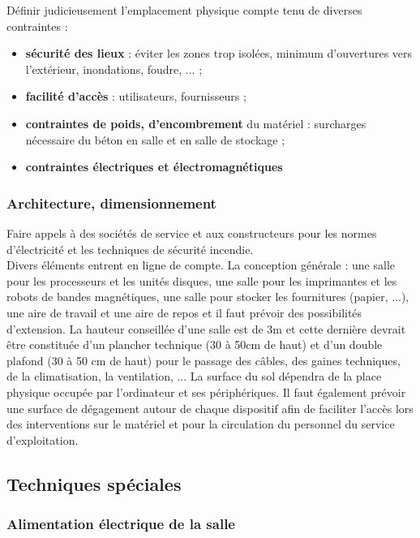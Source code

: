 \documentclass[10pt,a4paper,oneside,titlepage]{report}
\newcommand{\titre}[1]{\textcolor{title}{#1}}
\newcommand{\strong}[1]{\textbf{\titre{#1}}}
\begin{document}
\begin{sffamily}
Définir judicieusement l'emplacement physique compte tenu de diverses contraintes :\begin{itemize}
\item \strong{sécurité des lieux} : éviter les zones trop isolées, minimum d'ouvertures vers l'extérieur, inondations, foudre, ... ;
\item \strong{facilité d'accès} : utilisateurs, fournisseurs ;
\item \strong{contraintes de poids, d'encombrement} du matériel : surcharges nécessaire du béton en salle et en salle de stockage ;
\item \strong{contraintes électriques et électromagnétiques}
\end{itemize}

\subsubsection{Architecture, dimensionnement}

Faire appels à des sociétés de service et aux constructeurs pour les normes d'électricité et les techniques de sécurité incendie.\\
Divers éléments entrent en ligne de compte. La conception générale : une salle pour les processeurs et les unités disques, une salle pour les imprimantes et les robots de bandes magnétiques, une salle pour stocker les fournitures (papier, ...), une 
aire de travail et une aire de repos et il faut prévoir des possibilités d'extension. La hauteur conseillée d'une salle est de 3m et cette dernière devrait \^etre constituée d'un plancher technique (30 à 50cm de haut) et d'un double plafond (30 à 50 
cm de haut) pour le passage des c\^ables, des gaines techniques, de la climatisation, la ventilation, ... La surface du sol dépendra de la place physique occupée par l'ordinateur et ses périphériques. Il faut également prévoir une surface de 
dégagement autour de chaque dispositif afin de faciliter l'accès lors des interventions sur le matériel et pour la circulation du personnel du service d'exploitation.

\subsection{Techniques spéciales}

\subsubsection{Alimentation électrique de la salle}


\end{sffamily}
\end{document}

